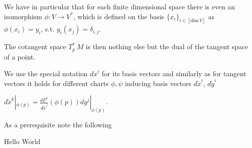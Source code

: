 We have in particular that for each finite dimensional space there is even an isomorphism \(\phi : V \to V^\ast \),
which is defined on the basis \( \{x_i\}_{i \in [\text{dim}\ V]} \) as \( \phi(x_i) = y_i \), s.t. \( y_i(x_j) = \delta_{i,j} \).

The cotangent space \( T^\ast_p\ M \) is then nothing else but the dual of the tangent space of a point.

We use the special notation \( dx^i \) for its basis vectors and similarly as for tangent vectors it holds for different
charts \( \phi, \psi \) inducing basis vectors \( d\tilde{x}^i \), \( d\tilde{y}^i \)

\( d\tilde{x}^k|_{\phi(p)} = \frac{dF^k}{d\tilde{x}^j}(\phi(p))dy^j|_{\phi(p)} \).


As a prerequisite note the following 

Hello World
